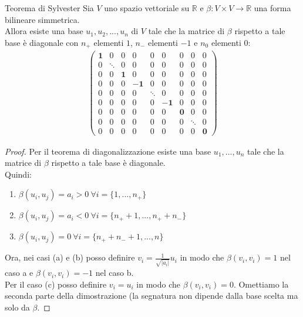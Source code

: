 \documentclass[a4paper]{article}
\theoremstyle{definition}
\begin{document}
	\begin{teo}{Teorema di Sylvester}{}
		Sia $V$ uno spazio vettoriale su $\mathbb{R}$ e $\beta: V \times V \to \mathbb{R}$ una forma bilineare simmetrica. \\
		Allora esiste una base $u_1, u_2, ..., u_n$ di $V$ tale che la matrice di $\beta$ rispetto a tale base è diagonale con $n_+$ elementi $1$, $n_-$ elementi $-1$ e $n_0$ elementi $0$:
		\begin{align*}
			\begin{pmatrix}
				\mathbf{1} & 0 & 0 & 0 & 0 & 0 & 0 & 0 & 0 \\
				0 & \mathbf{\ddots} & 0 & 0 & 0 & 0 & 0 & 0 & 0 \\
				0 & 0 & \mathbf{1} & 0 & 0 & 0 & 0 & 0 & 0 \\
				0 & 0 & 0 & \mathbf{-1} & 0 & 0 & 0 & 0 & 0 \\
				0 & 0 & 0 & 0 & \mathbf{\ddots} & 0 & 0 & 0 & 0 \\
				0 & 0 & 0 & 0 & 0 & \mathbf{-1}& 0 & 0 & 0 \\
				0 & 0 & 0 & 0 & 0 & 0 & \mathbf{0} & 0 & 0 \\
				0 & 0 & 0 & 0 & 0 & 0 & 0 & \mathbf{\ddots} & 0 \\
				0 & 0 & 0 & 0 & 0 & 0 & 0 & 0 & \mathbf{0}
			\end{pmatrix}
		\end{align*}
	\end{teo}

	\begin{proof}
		Per il teorema di diagonalizzazione esiste una base $u_1, ..., u_n$ tale che la matrice di $\beta$ rispetto a tale base è diagonale. \\
		Quindi:
		\begin{enumerate}[label=(\alph*)]
			\item $\beta(u_i, u_j) = a_i > 0 \ \forall i = \{1, ..., n_+\}$
			\item $\beta(u_i, u_j) = a_i < 0 \ \forall i = \{n_+ + 1, ..., n_+ + n_-\}$
			\item $\beta(u_i, u_j) = 0 \ \forall i = \{n_+ + n_- + 1, ..., n\}$
		\end{enumerate}
		Ora, nei casi (a) e (b) posso definire $v_i = \frac{1}{\sqrt{|a_i|}}u_i$ in modo che $\beta(v_i, v_i) = 1$ nel caso a e $\beta(v_i, v_i) = -1$ nel caso b. \\
		Per il caso (c) posso definire $v_i = u_i$ in modo che $\beta(v_i, v_i) = 0$.
		Omettiamo la seconda parte della dimostrazione (la segnatura non dipende dalla base scelta ma solo da $\beta$.
	\end{proof}
\end{document}
